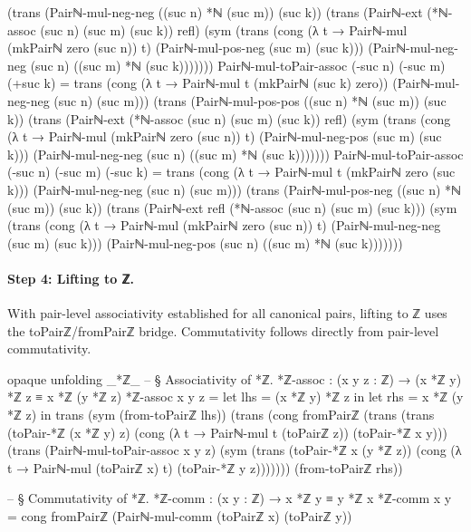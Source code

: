 \documentclass[11pt,a4paper]{book}
\def\texttt#1{#1}%
\begin{document}
\begin{code}
    (trans
      (Pairℕ-mul-neg-neg ((suc n) *ℕ (suc m)) (suc k))
      (trans
        (Pairℕ-ext (*ℕ-assoc (suc n) (suc m) (suc k)) refl)
        (sym
          (trans
            (cong (λ t → Pairℕ-mul (mkPairℕ zero (suc n)) t) (Pairℕ-mul-pos-neg (suc m) (suc k)))
            (Pairℕ-mul-neg-neg (suc n) ((suc m) *ℕ (suc k)))))))
Pairℕ-mul-toPair-assoc (-suc n) (-suc m) (+suc k) =
  trans
    (cong (λ t → Pairℕ-mul t (mkPairℕ (suc k) zero)) (Pairℕ-mul-neg-neg (suc n) (suc m)))
    (trans
      (Pairℕ-mul-pos-pos ((suc n) *ℕ (suc m)) (suc k))
      (trans
        (Pairℕ-ext (*ℕ-assoc (suc n) (suc m) (suc k)) refl)
        (sym
          (trans
            (cong (λ t → Pairℕ-mul (mkPairℕ zero (suc n)) t) (Pairℕ-mul-neg-pos (suc m) (suc k)))
            (Pairℕ-mul-neg-neg (suc n) ((suc m) *ℕ (suc k)))))))
Pairℕ-mul-toPair-assoc (-suc n) (-suc m) (-suc k) =
  trans
    (cong (λ t → Pairℕ-mul t (mkPairℕ zero (suc k))) (Pairℕ-mul-neg-neg (suc n) (suc m)))
    (trans
      (Pairℕ-mul-pos-neg ((suc n) *ℕ (suc m)) (suc k))
      (trans
        (Pairℕ-ext refl (*ℕ-assoc (suc n) (suc m) (suc k)))
        (sym
          (trans
            (cong (λ t → Pairℕ-mul (mkPairℕ zero (suc n)) t) (Pairℕ-mul-neg-neg (suc m) (suc k)))
            (Pairℕ-mul-neg-pos (suc n) ((suc m) *ℕ (suc k)))))))
\end{code}

\paragraph{Step 4: Lifting to ℤ.}
With pair-level associativity established for all canonical pairs,
lifting to ℤ uses the \texttt{toPairℤ}/\texttt{fromPairℤ} bridge.
Commutativity follows directly from pair-level commutativity.

\begin{code}
opaque
  unfolding _*ℤ_
  -- § Associativity of *ℤ.
  *ℤ-assoc : (x y z : ℤ) → (x *ℤ y) *ℤ z ≡ x *ℤ (y *ℤ z)
  *ℤ-assoc x y z =
    let lhs = (x *ℤ y) *ℤ z in
    let rhs = x *ℤ (y *ℤ z) in
    trans
      (sym (from-toPairℤ lhs))
      (trans
        (cong fromPairℤ
          (trans
            (trans
              (toPair-*ℤ (x *ℤ y) z)
              (cong (λ t → Pairℕ-mul t (toPairℤ z)) (toPair-*ℤ x y)))
            (trans
              (Pairℕ-mul-toPair-assoc x y z)
              (sym
                (trans
                  (toPair-*ℤ x (y *ℤ z))
                  (cong (λ t → Pairℕ-mul (toPairℤ x) t) (toPair-*ℤ y z)))))))
        (from-toPairℤ rhs))

  -- § Commutativity of *ℤ.
  *ℤ-comm : (x y : ℤ) → x *ℤ y ≡ y *ℤ x
  *ℤ-comm x y = cong fromPairℤ (Pairℕ-mul-comm (toPairℤ x) (toPairℤ y))
\end{code}
\end{document}
